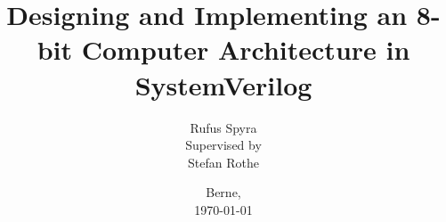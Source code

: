 \documentclass[parskip=full]{scrreprt}
\title{Designing and Implementing an 8-bit Computer Architecture in SystemVerilog}
\author{Rufus Spyra\vspace{1cm}\\
Supervised by \\
Stefan Rothe}
\date{Berne,\\
\today}
\begin{document}
\maketitle

\tableofcontents









\listoffigures
\listoftables
\lstlistoflistings
\printbibliography


\end{document}
